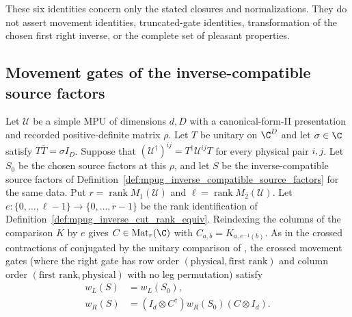 These six identities concern only the stated closures and normalizations.
They do not assert movement identities, truncated-gate identities, transformation
of the chosen first right inverse, or the complete set of pleasant properties.

\subsection{Movement gates of the inverse-compatible source factors}

\begin{lemma}
    \label{thm:mpug_inverse_movement_transport}
    \leanok
    Let $\mathcal U$ be a simple MPU of dimensions $d,D$ with a
    canonical-form-II presentation and recorded positive-definite matrix
    $\rho$. Let $T$ be unitary on $\C^D$ and let $\sigma\in\C$ satisfy
    $T\overline T=\sigma I_D$. Suppose that
    $(\mathcal U^\dagger)^{ij}=T^\dagger\mathcal U^{ij}T$ for every
    physical pair $i,j$. Let $S_0$ be the chosen source factors at this
    $\rho$, and let $S$ be the inverse-compatible source factors of
    Definition~\ref{def:mpug_inverse_compatible_source_factors} for the
    same data. Put $r=\operatorname{rank}M_1(\mathcal U)$ and
    $\ell=\operatorname{rank}M_2(\mathcal U)$. Let
    $e\colon\{0,\ldots,\ell-1\}\to\{0,\ldots,r-1\}$ be the
    rank identification of Definition~\ref{def:mpug_inverse_cut_rank_equiv}.
    Reindexing the columns of the comparison $K$ by $e$ gives
    $C\in\operatorname{Mat}_r(\C)$ with $C_{a,b}=K_{a,e^{-1}(b)}$. As in the
    crossed contractions of \cite[lines~811--869]{FrancoRubio2025MPUGauging}
    conjugated by the unitary comparison of
    \cite[lines~5486--5487]{FrancoRubio2025MPUGauging}, the crossed movement
    gates (where the right gate has row order $(\text{physical},\text{first rank})$
    and column order $(\text{first rank},\text{physical})$ with no leg
    permutation) satisfy
    \begin{align}
        w_L(S) & =w_L(S_0),                                     \\
        w_R(S) & =(I_d\otimes C^\dagger)w_R(S_0)(C\otimes I_d).
        \label{eq:mpug_inverse_movement_transport}
    \end{align}
\end{lemma}
